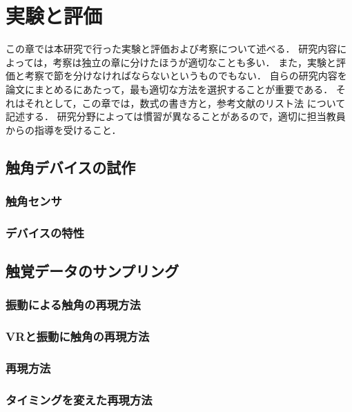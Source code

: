 \chapter{実験と評価}	%
\thispagestyle{plain}   %

この章では本研究で行った実験と評価および考察について述べる．
研究内容によっては，考察は独立の章に分けたほうが適切なことも多い．
また，実験と評価と考察で節を分けなければならないというものでもない．
自らの研究内容を論文にまとめるにあたって，最も適切な方法を選択することが重要である．
それはそれとして，この章では，数式の書き方と，参考文献のリスト法
について記述する．
研究分野によっては慣習が異なることがあるので，適切に担当教員からの指導を受けること．

\section{触角デバイスの試作}
\subsection{触角センサ}
\subsection{デバイスの特性}

\section{触覚データのサンプリング}
\subsection{振動による触角の再現方法}
\subsection{VRと振動に触角の再現方法}
\subsection{再現方法}
\subsection{タイミングを変えた再現方法}